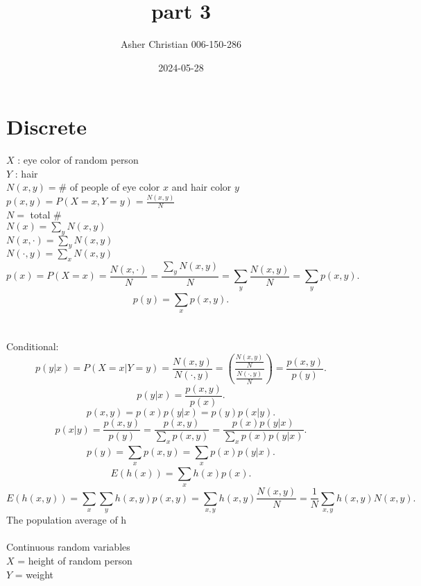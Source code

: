 \documentclass{article}
\title{part 3}
\author{Asher Christian 006-150-286}
\date{2024-05-28}
\begin{document}
    \maketitle
    \section{Discrete}
    $X$ : eye color of random person\\
    $Y$ : hair\\
    $N(x,y) = \#$ of people of eye color $x$ and hair color $y$ \\
    $p(x,y) = P(X = x , Y = y) = \frac{N(x,y)}{N}$ \\
    $N =$ total \#\\
    $N(x) = \sum_{y}N(x,y)$ \\
    $N(x,\cdot) = \sum_{y}^{}N(x,y)$\\ 
    $N(\cdot,y) = \sum_{x}^{}N(x,y)$ \\
    \[
    p(x) = P(X=x) = \frac{N(x, \cdot)}{N} = \frac{\sum_{y}^{}N(x,y)}{N} = \sum_{y}^{}\frac{N(x,y)}{N} = \sum_{y}^{}p(x,y)
    .\] 
    \[
    p(y) = \sum_{x}^{}p(x,y)
    .\] 
   \\\\
   Conditional:
   \[
       p(y|x) = P(X=x | Y = y) = \frac{N(x,y)}{N(\cdot ,y)} = (\frac{\frac{N(x,y)}{N}}{\frac{N(\cdot ,y)}{N}}) = \frac{p(x,y)}{p(y)}
   .\] 
   \[
   p(y|x) = \frac{p(x,y)}{p(x)}
   .\] 
   \[
   p(x,y) = p(x)p(y|x) = p(y)p(x|y)
   .\] 
   \[
   p(x|y) = \frac{p(x,y)}{p(y)} = \frac{p(x,y)}{\sum_{x}^{}p(x,y)} = \frac{p(x)p(y|x)}{\sum_{x}^{}p(x)p(y|x)}
   .\] 
   \[
   p(y) = \sum_{x}^{}p(x,y) = \sum_{x}^{}p(x)p(y|x)
   .\] 
   \[
   E(h(x)) = \sum_{x}^{}h(x)p(x)
   .\] 
   \[
   E(h(x,y)) = \sum_{x}^{}\sum_{y}^{}h(x,y)p(x,y) = \sum_{x, y}^{}h(x,y) \frac{N(x,y)}{N} = \frac{1}{N} \sum_{x,y}^{}h(x,y)N(x,y)
   .\] 
   The population average of h\\\\
   Continuous random variables\\
   $X$ = height of random person\\
   $Y$ = weight\\
\end{document}
